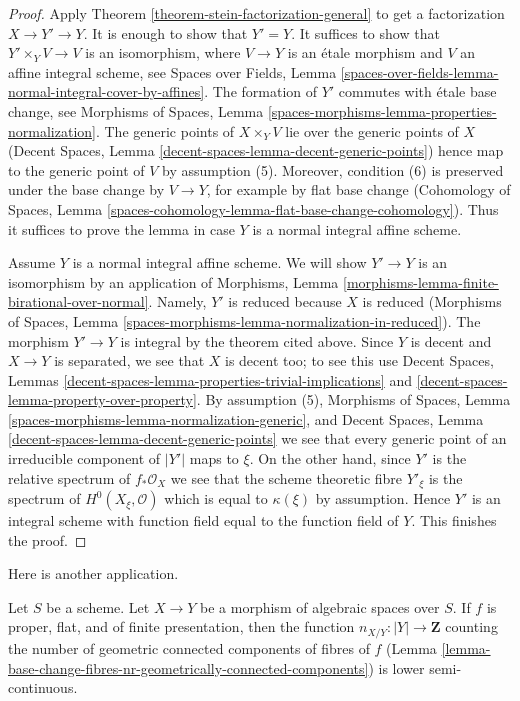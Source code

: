 \begin{proof}
Apply Theorem \ref{theorem-stein-factorization-general} to get a
factorization $X \to Y' \to Y$. It is enough to show that $Y' = Y$.
It suffices to show that $Y' \times_Y V \to V$ is an isomorphism,
where $V \to Y$ is an \'etale morphism and $V$ an affine integral scheme,
see Spaces over Fields, Lemma
\ref{spaces-over-fields-lemma-normal-integral-cover-by-affines}.
The formation of $Y'$ commutes with \'etale base change, see
Morphisms of Spaces, Lemma
\ref{spaces-morphisms-lemma-properties-normalization}.
The generic points of $X \times_Y V$ lie over the generic points of $X$
(Decent Spaces, Lemma \ref{decent-spaces-lemma-decent-generic-points})
hence map to the generic point of $V$ by assumption (5). Moreover, condition
(6) is preserved under the base change by $V \to Y$, for example by
flat base change (Cohomology of Spaces, Lemma
\ref{spaces-cohomology-lemma-flat-base-change-cohomology}).
Thus it suffices to prove the lemma in case $Y$ is a normal
integral affine scheme.

\medskip\noindent
Assume $Y$ is a normal integral affine scheme. We will show $Y' \to Y$
is an isomorphism by an application of Morphisms, Lemma
\ref{morphisms-lemma-finite-birational-over-normal}.
Namely, $Y'$ is reduced because $X$ is reduced (Morphisms of Spaces, Lemma
\ref{spaces-morphisms-lemma-normalization-in-reduced}).
The morphism $Y' \to Y$ is integral by the theorem cited above.
Since $Y$ is decent and $X \to Y$ is separated, we see that
$X$ is decent too; to see this use
Decent Spaces, Lemmas
\ref{decent-spaces-lemma-properties-trivial-implications} and
\ref{decent-spaces-lemma-property-over-property}. By assumption (5),
Morphisms of Spaces, Lemma \ref{spaces-morphisms-lemma-normalization-generic},
and Decent Spaces, Lemma \ref{decent-spaces-lemma-decent-generic-points}
we see that every generic point of an irreducible component of $|Y'|$
maps to $\xi$. On the other hand, since $Y'$ is the relative
spectrum of $f_*\mathcal{O}_X$ we see that the scheme theoretic fibre
$Y'_\xi$ is the spectrum of $H^0(X_\xi, \mathcal{O})$ which is
equal to $\kappa(\xi)$ by assumption. Hence $Y'$ is an integral
scheme with function field equal to the function field of $Y$.
This finishes the proof.
\end{proof}

\noindent
Here is another application.

\begin{lemma}
\label{lemma-proper-flat-nr-geom-conn-comps-lower-semicontinuous}
Let $S$ be a scheme.
Let $X \to Y$ be a morphism of algebraic spaces over $S$.
If $f$ is proper, flat, and of finite presentation, then the function
$n_{X/Y} : |Y| \to \mathbf{Z}$ counting the number of geometric
connected components of fibres of $f$
(Lemma \ref{lemma-base-change-fibres-nr-geometrically-connected-components})
is lower semi-continuous.
\end{lemma}

